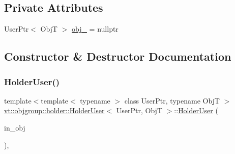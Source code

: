\subsection*{Private Attributes}
\begin{DoxyCompactItemize}
\item 
User\+Ptr$<$ ObjT $>$ \hyperlink{structvt_1_1objgroup_1_1holder_1_1_holder_user_a7e5ba27e81a9cb9aa4bfe4eb3ee04e5c}{obj\+\_\+} = nullptr
\end{DoxyCompactItemize}


\subsection{Constructor \& Destructor Documentation}
\mbox{\label{structvt_1_1objgroup_1_1holder_1_1_holder_user_a5c81ffca6d44450a02c9d74c650d2178}} 
\subsubsection{\texorpdfstring{Holder\+User()}{HolderUser()}}
{\footnotesize\ttfamily template$<$template$<$ typename $>$ class User\+Ptr, typename ObjT $>$ \\
\hyperlink{structvt_1_1objgroup_1_1holder_1_1_holder_user}{vt\+::objgroup\+::holder\+::\+Holder\+User}$<$ User\+Ptr, ObjT $>$\+::\hyperlink{structvt_1_1objgroup_1_1holder_1_1_holder_user}{Holder\+User} (\begin{DoxyParamCaption}\item[{User\+Ptr$<$ ObjT $>$}]{in\+\_\+obj }\end{DoxyParamCaption})\hspace{0.3cm}{\ttfamily [inline]}, {\ttfamily [explicit]}}

\mbox{\label{structvt_1_1objgroup_1_1holder_1_1_holder_user_a694de38808a7075ef8fa919d9e983c8b}} 
